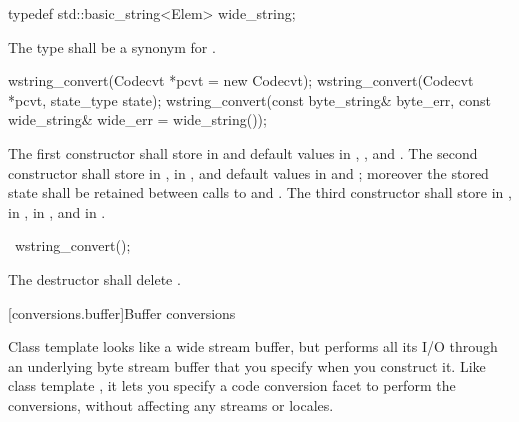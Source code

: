 %
%
\begin{itemdecl}
typedef std::basic_string<Elem> wide_string;
\end{itemdecl}

\begin{itemdescr}
\pnum
The type shall be a synonym for .
\end{itemdescr}

%
\begin{itemdecl}
wstring_convert(Codecvt *pcvt = new Codecvt);
wstring_convert(Codecvt *pcvt, state_type state);
wstring_convert(const byte_string& byte_err,
    const wide_string& wide_err = wide_string());
\end{itemdecl}

\begin{itemdescr}
\pnum
\effects
The first constructor shall store  in  and
default values in , , and
.
The second constructor shall store  in ,
 in , and default values in
 and ; moreover the
stored state shall be retained between calls to  and
.
The third constructor shall store  in ,
 in , 
in , and  in
.
\end{itemdescr}

%
\begin{itemdecl}
~wstring_convert();
\end{itemdecl}

\begin{itemdescr}
\pnum
\effects The destructor shall delete .
\end{itemdescr}

[conversions.buffer]{Buffer conversions}

\pnum
Class template  looks like a wide stream buffer, but
performs all its I/O through an underlying byte stream buffer that you
specify when you construct it. Like class template , it
lets you specify a code conversion facet to perform the conversions,
without affecting any streams or locales.

